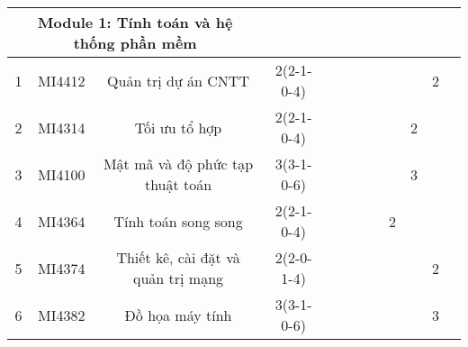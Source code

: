 \documentclass[12pt,a4paper]{report}
\begin{document}
\begin{landscape}
\begin{longtable}[c]{|c|c|c|c|c|c|c|c|c|c|c|c|}
        \multicolumn{3}{|c|}{\textbf{Module 1: Tính toán và hệ thống phần mềm}}                                                        &                                                                                      &             &             &             &             &             &             &             &             \\ \hline
        1                             & MI4412                          & Quản trị dự án CNTT                                          & 2(2-1-0-4)                                                                           &             &             &             &             &             &             & 2           &             \\ \hline
        2                             & MI4314                          & Tối ưu tổ hợp                                                & 2(2-1-0-4)                                                                           &             &             &             &             &             & 2           &             &             \\ \hline
        3                             & MI4100                          & Mật mã và độ phức tạp thuật toán                             & 3(3-1-0-6)                                                                           &             &             &             &             &             & 3           &             &             \\ \hline
        4                             & MI4364                          & Tính toán song song                                          & 2(2-1-0-4)                                                                           &             &             &             &             & 2           &             &             &             \\ \hline
        5                             & MI4374                          & Thiết kê, cài đặt và quản trị mạng                           & 2(2-0-1-4)                                                                           &             &             &             &             &             &             & 2           &             \\ \hline
        6                             & MI4382                          & Đồ họa máy tính                                              & 3(3-1-0-6)                                                                           &             &             &             &             &             &             & 3           &             \\ \hline

\end{longtable}
\end{landscape}
\end{document}
